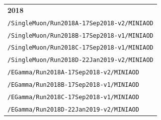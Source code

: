 \begin{table}[tp]
\begin{tabular}{| l |}
{\bf 2018} \\
\tiny {\tt /SingleMuon/Run2018A-17Sep2018-v2/MINIAOD} \\
\tiny {\tt /SingleMuon/Run2018B-17Sep2018-v1/MINIAOD} \\
\tiny {\tt /SingleMuon/Run2018C-17Sep2018-v1/MINIAOD} \\
\tiny {\tt /SingleMuon/Run2018D-22Jan2019-v2/MINIAOD} \\
\tiny {\tt /EGamma/Run2018A-17Sep2018-v2/MINIAOD} \\
\tiny {\tt /EGamma/Run2018B-17Sep2018-v1/MINIAOD} \\
\tiny {\tt /EGamma/Run2018C-17Sep2018-v1/MINIAOD} \\
\tiny {\tt /EGamma/Run2018D-22Jan2019-v2/MINIAOD} \\
\hline
\end{tabular}
\end{table}

